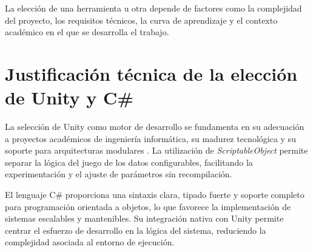 La elección de una herramienta u otra depende de factores como la complejidad del proyecto, los requisitos técnicos, la curva de aprendizaje y el contexto académico en el que se desarrolla el trabajo.

\section{Justificación técnica de la elección de Unity y C\#}

La selección de Unity como motor de desarrollo se fundamenta en su adecuación a proyectos académicos de ingeniería informática, su madurez tecnológica y su soporte para arquitecturas modulares \cite{REF_UNITY}. La utilización de \textit{ScriptableObject} permite separar la lógica del juego de los datos configurables, facilitando la experimentación y el ajuste de parámetros sin recompilación.

El lenguaje C\# proporciona una sintaxis clara, tipado fuerte y soporte completo para programación orientada a objetos, lo que favorece la implementación de sistemas escalables y mantenibles. Su integración nativa con Unity permite centrar el esfuerzo de desarrollo en la lógica del sistema, reduciendo la complejidad asociada al entorno de ejecución.
